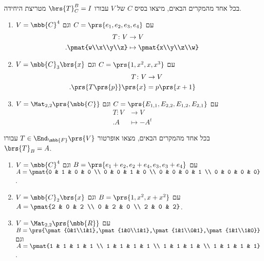 \documentclass[a4paper,10pt,twoside,openany]{article}
\begin{document}
\begin{exercise}
בכל אחד מהמקרים הבאים, מיצאו בסיס
$C$
של
$V$
עבורו
$\brs{T}^B_C = I$
מטריצת היחידה.

\begin{enumerate}
\item $V = \mbb{C}^4$
עם
$C = \prs{e_1, e_2, e_3, e_4}$
וגם
\begin{align*}
T \colon V &\to V \\
\text{.} \pmat{w\\x\\y\\z} &\mapsto \pmat{x\\y\\z\\w}
\end{align*}

\item $V = \mbb{C}_3\brs{x}$
עם
$C = \prs{1,x^2,x,x^3}$
וגם
\begin{align*}
T \colon V &\to V \\
\text{.} \prs{T\prs{p}}\prs{x} &= p\prs{x+1}
\end{align*}

\item $V = \Mat_{2,2}\prs{\mbb{C}}$
עם
$C = \prs{E_{1,1}, E_{2,2}, E_{1,2}, E_{2,1}}$
וגם
\begin{align*}
T \colon V &\to V \\
\text{.} A &\mapsto -A^t
\end{align*}
\end{enumerate}
\end{exercise}

\begin{exercise}
בכל אחד מהמקרים הבאים, מצאו אופרטור
$T \in \End_{\mbb{F}}\prs{V}$
עבורו
$\brs{T}_B = A$.

\begin{enumerate}
\item $V = \mbb{C}^4$
עם
$B = \prs{e_1+e_2,e_2+e_4,e_3,e_3+e_4}$
וגם
$A = \pmat{0 & 1 & 0 & 0 \\ 0 & 0 & 1 & 0 \\ 0 & 0 & 0 & 1 \\ 0 & 0 & 0 & 0}$.

\item $V = \mbb{C}_2\brs{x}$
עם
$B = \prs{1,x^2,x+x^2}$
וגם
$A = \pmat{2 & 0 & 2 \\ 0 & 2 & 0 \\ 2 & 0 & 2}$.

\item $V = \Mat_{2,2}\prs{\mbb{R}}$
עם
$B = \prs{\pmat{0&1\\1&1},\pmat{1&0\\1&1},\pmat{1&1\\0&1},\pmat{1&1\\1&0}}$
וגם
$A = \pmat{1 & 1 & 1 & 1 \\ 1 & 1 & 1 & 1 \\ 1 & 1 & 1 & \\ 1 & 1 & 1 & 1}$.
\end{enumerate}
\end{exercise}
\end{document}
